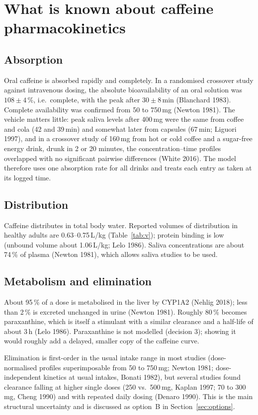 \documentclass[10pt,a4paper]{article}
\begin{document}
\section{What is known about caffeine pharmacokinetics}
\label{sec:pk}
\subsection{Absorption}
Oral caffeine is absorbed rapidly and completely. In a randomised crossover study against intravenous
dosing, the absolute bioavailability of an oral solution was $108\pm4\,\%$, i.e.\ complete, with the peak
after $30\pm8$\,min (Blanchard 1983). Complete availability was confirmed from 50 to 750\,mg (Newton 1981).
The vehicle matters little: peak saliva levels after 400\,mg were the same from coffee and cola (42 and
39\,min) and somewhat later from capsules (67\,min; Liguori 1997), and in a crossover study of 160\,mg
from hot or cold coffee and a sugar-free energy drink, drunk in 2 or 20 minutes, the concentration--time
profiles overlapped with no significant pairwise differences (White 2016). The model therefore uses one
absorption rate for all drinks and treats each entry as taken at its logged time.

\subsection{Distribution}
Caffeine distributes in total body water. Reported volumes of distribution in healthy adults are
0.63--0.75\,L/kg (Table~\ref{tab:v}); protein binding is low (unbound volume about 1.06\,L/kg; Lelo 1986).
Saliva concentrations are about 74\,\% of plasma (Newton 1981), which allows saliva studies to be used.

\subsection{Metabolism and elimination}
\label{sec:metab}
About 95\,\% of a dose is metabolised in the liver by CYP1A2 (Nehlig 2018); less than 2\,\% is excreted
unchanged in urine (Newton 1981). Roughly 80\,\% becomes paraxanthine, which is itself a stimulant with a
similar clearance and a half-life of about 3\,h (Lelo 1986). Paraxanthine is not modelled (decision 3);
showing it would roughly add a delayed, smaller copy of the caffeine curve.

Elimination is first-order in the usual intake range in most studies (dose-normalised profiles
superimposable from 50 to 750\,mg; Newton 1981; dose-independent kinetics at usual intakes, Bonati 1982),
but several studies found clearance falling at higher single doses (250 vs.\ 500\,mg, Kaplan 1997; 70 to
300\,mg, Cheng 1990) and with repeated daily dosing (Denaro 1990). This is the main structural uncertainty
and is discussed as option~B in Section~\ref{sec:options}.
\end{document}
